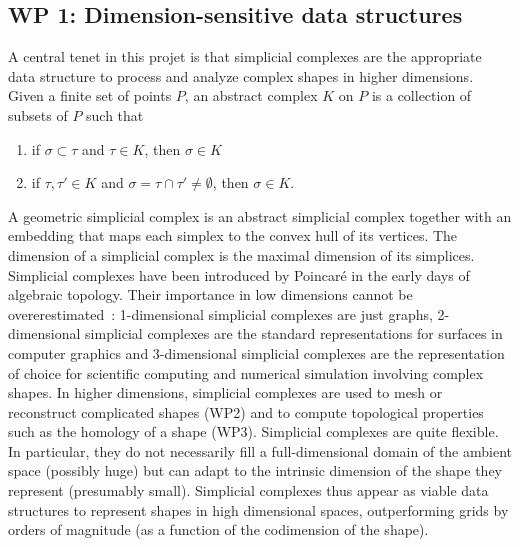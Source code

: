 \subsection*{WP 1:  Dimension-sensitive data structures} 

A central tenet in this projet is that simplicial complexes are the appropriate data structure
to process and analyze complex shapes in higher dimensions. Given a finite set of points $P$, an abstract complex $K$ on $P$ is a collection of subsets of $P$ such that 
\begin{enumerate}
\item if $\sigma\subset \tau$ and $\tau\in K$, then $\sigma \in K$
\item if $\tau, \tau'\in K$ and $\sigma = \tau\cap \tau'\neq\emptyset$, then $\sigma\in K$.
\end{enumerate}
A geometric simplicial complex is an abstract simplicial complex together with an embedding that maps each simplex to the convex hull of its vertices. The dimension of a simplicial complex is the maximal dimension of its simplices. Simplicial complexes have been introduced by Poincar\'e in the early days of algebraic topology. Their importance in low dimensions cannot be overerestimated~: 1-dimensional simplicial complexes are just graphs, 2-dimensional simplicial complexes are the standard representations for surfaces in computer graphics and 3-dimensional simplicial complexes are the representation of choice for scientific computing and numerical simulation involving complex shapes. In higher dimensions, simplicial complexes are used to mesh or reconstruct complicated shapes (WP2) and to compute topological properties such as the homology of a shape (WP3). Simplicial complexes are quite flexible. In particular, they do not necessarily fill a full-dimensional domain of the ambient space (possibly huge) but  can adapt to the intrinsic dimension of the shape they represent (presumably small).  Simplicial complexes thus appear as viable data structures to represent shapes in high dimensional spaces, outperforming  grids by orders of magnitude (as a function of the codimension of the shape). 


